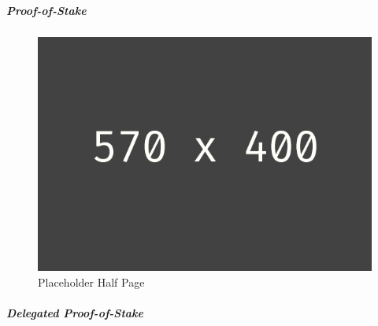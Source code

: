 \subparagraph{Proof-of-Stake}
\begin{figure}[h!]
	\centering
	\includegraphics[width=1.0\linewidth]{pictures/placeholder_half_page}
	\caption[Placeholder Half Page]{Placeholder Half Page}
	\label{fig:placeholder_half_page}
\end{figure}

\subparagraph{Delegated Proof-of-Stake}

\newpage
